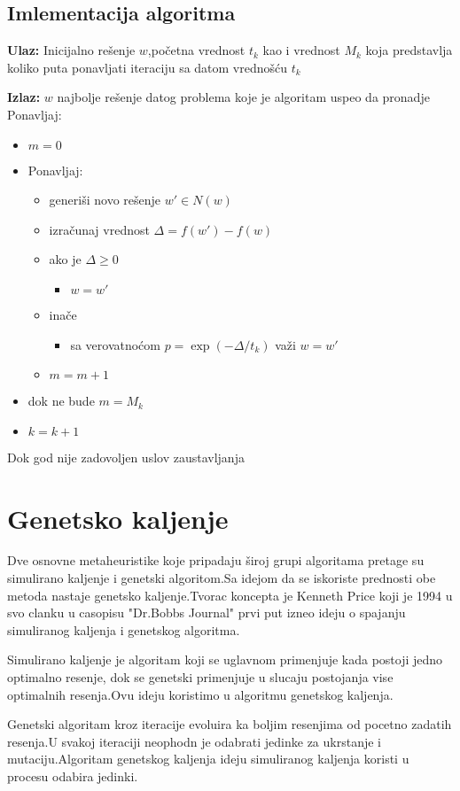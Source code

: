 \documentclass[a4paper]{article}
\begin{document}
\subsection{Imlementacija algoritma}
\textbf{Ulaz:} Inicijalno rešenje $w$,početna vrednost $t_k$ kao i vrednost $M_k$ koja predstavlja koliko puta ponavljati iteraciju sa datom vrednošću $t_k$
 \par
\textbf{Izlaz:} $w$ najbolje rešenje datog problema koje je algoritam uspeo da pronadje
\newline
Ponavljaj:
\begin{itemize}
\item[] $m=0$
\item[]  Ponavljaj:
\begin{itemize}
\item[] generiši novo rešenje  $w'\in N(w)$
\item[] izračunaj vrednost  $\Delta=f(w')-f(w)$
\item[] ako je $\Delta \geq 0$
\begin{itemize}
\item[] $w=w'$ 
\end{itemize}
\item[]inače
\begin{itemize}
\item[] sa verovatnoćom $p=\exp(-\Delta/t_k)$ važi $w=w'$ 
\end{itemize}
\item[]$m=m+1$
\end{itemize}
\item[]dok ne bude $ m=M_k$
\item[] $k=k+1$
\end{itemize}
Dok god nije zadovoljen uslov zaustavljanja


\section{Genetsko kaljenje}
Dve osnovne metaheuristike koje pripadaju široj grupi algoritama pretage su simulirano kaljenje i genetski algoritom.Sa idejom da se iskoriste prednosti obe metoda nastaje genetsko kaljenje.Tvorac koncepta je Kenneth Price koji je 1994 u svo clanku u casopisu "Dr.Bobbs Journal" prvi put izneo ideju o spajanju simuliranog kaljenja i genetskog algoritma. \par
Simulirano kaljenje je algoritam koji se uglavnom primenjuje kada postoji jedno optimalno resenje, dok se genetski primenjuje u slucaju postojanja vise optimalnih resenja.Ovu ideju koristimo u algoritmu genetskog kaljenja. \par
Genetski algoritam kroz iteracije evoluira ka boljim resenjima od pocetno zadatih resenja.U svakoj iteraciji neophodn je odabrati jedinke za ukrstanje i mutaciju.Algoritam genetskog kaljenja ideju simuliranog kaljenja koristi u procesu odabira jedinki.
\end{document}
